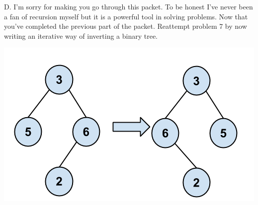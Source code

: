\documentclass[12pt]{article}
\begin{document}
\newpage
\noindent D. I'm sorry for making you go through this packet. To be honest I've never been a fan of recursion myself but it is a powerful tool in solving problems. Now that you've completed the previous part of the packet. Reattempt problem 7 by now writing an iterative way of inverting a binary tree.
\centerline{\includegraphics[scale = 0.4]{invertbtree.png}}
\end{document}
